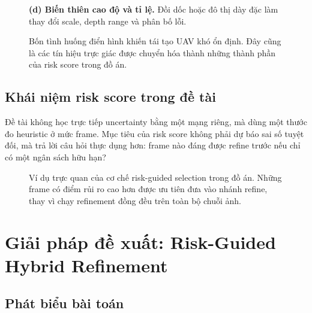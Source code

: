 \documentclass[12pt,a4paper,oneside]{report}
\begin{document}
\begin{figure}[H]
\begin{minipage}[t]{0.47\textwidth}
{\scriptsize \textbf{(d) Biến thiên cao độ và tỉ lệ.} Đồi dốc hoặc đô thị dày đặc làm thay đổi scale, depth range và phân bố lỗi.}
\end{minipage}
\caption{Bốn tình huống điển hình khiến tái tạo UAV khó ổn định. Đây cũng là các tín hiệu trực giác được chuyển hóa thành những thành phần của risk score trong đồ án.}
\label{fig:uav-difficulty-factors}
\end{figure}

\section{Khái niệm risk score trong đề tài}

Đề tài không học trực tiếp uncertainty bằng một mạng riêng, mà dùng một thước đo heuristic ở mức frame. Mục tiêu của risk score không phải dự báo sai số tuyệt đối, mà trả lời câu hỏi thực dụng hơn: frame nào đáng được refine trước nếu chỉ có một ngân sách hữu hạn?

\begin{figure}[H]
\centering
{}
\caption{Ví dụ trực quan của cơ chế risk-guided selection trong đồ án. Những frame có điểm rủi ro cao hơn được ưu tiên đưa vào nhánh refine, thay vì chạy refinement đồng đều trên toàn bộ chuỗi ảnh.}
\label{fig:risk-selection-theory}
\end{figure}

\chapter{Giải pháp đề xuất: Risk-Guided Hybrid Refinement}

\section{Phát biểu bài toán}
\end{document}
